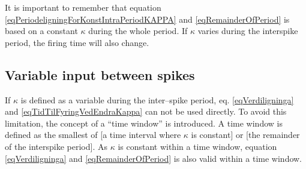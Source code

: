 It is important to remember that equation \eqref{eqPeriodeligningForKonstIntraPeriodKAPPA} and \eqref{eqRemainderOfPeriod} is based on a constant $\kappa$ during the whole period. 
If $\kappa$ varies during the interspike period, the firing time will also change. 




\subsection{Variable input between spikes}
\label{ssecVariableInputBetweenSpikes}


If $\kappa$ is defined as a variable during the inter--spike period, eq. \eqref{eqVerdiligninga} and \eqref{eqTidTilFyringVedEndraKappa} can not be used directly.
To avoid this limitation, the concept of a ``time window'' is introduced. 
A time window is defined as the smallest of [a time interval where $\kappa$ is constant] or [the remainder of the interspike period].
As $\kappa$ is constant within a time window, equation \eqref{eqVerdiligninga} and \eqref{eqRemainderOfPeriod} is also valid within a time window.

